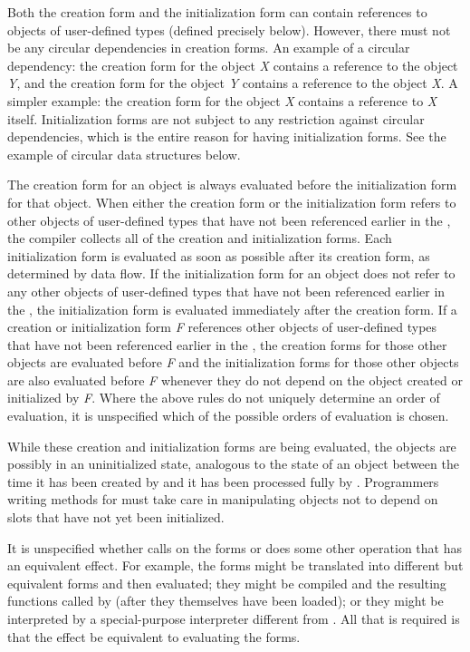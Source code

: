\begin{newer}
\begin{defun}
  Both the creation form and the initialization form can contain
  references to objects of user-defined types (defined precisely below).
  However, there must not be any circular dependencies in creation forms.
  An example of a circular dependency: the creation form for the
  object {\it X\/} contains a reference to the object {\it Y\/}, and the creation form
  for the object {\it Y\/} contains a reference to the object {\it X\/}.  A simpler
  example: the creation form for the object {\it X\/} contains
  a reference to {\it X\/} itself.  Initialization forms are not subject to
  any restriction against circular dependencies, which is the entire
  reason for having initialization forms.  See the example of circular
  data structures below.

  The creation form for an object is always evaluated before the
  initialization form for that object.  When either the creation form or
  the initialization form refers to other objects of user-defined types
  that have not been referenced earlier in the , the
  compiler collects all of the creation and initialization forms.  Each
  initialization form is evaluated as soon as possible after its
  creation form, as determined by data flow.  If the initialization form
  for an object does not refer to any other objects of user-defined
  types that have not been referenced earlier in the , the
  initialization form is evaluated immediately after the creation form.
  If a creation or initialization form {\it F\/} references other objects of
  user-defined types that have not been referenced earlier in the
  , the creation forms for those other objects are evaluated
  before {\it F\/} and the initialization forms for those other objects are
  also evaluated before {\it F\/} whenever they do not depend on the object
  created or initialized by {\it F}.  Where the above rules do not uniquely
  determine an order of evaluation, it is unspecified
  which of the possible orders of evaluation is chosen.

  While these creation and initialization forms are being evaluated, the
  objects are possibly in an uninitialized state, analogous to the state
  of an object between the time it has been created by 
  and it has been processed fully by .  Programmers
  writing methods for  must take care in manipulating
  objects not to depend on slots that have not yet been initialized.

  It is unspecified whether  calls  on the forms or does some
  other operation that has an equivalent effect.  For example, the
  forms might be translated into different but equivalent forms and
  then evaluated; they might be compiled and the resulting functions
  called by  (after they themselves have been loaded);
  or they might be interpreted by a special-purpose
  interpreter different from .  All that is required is that the
  effect be equivalent to evaluating the forms.


\end{defun}
\end{newer}
